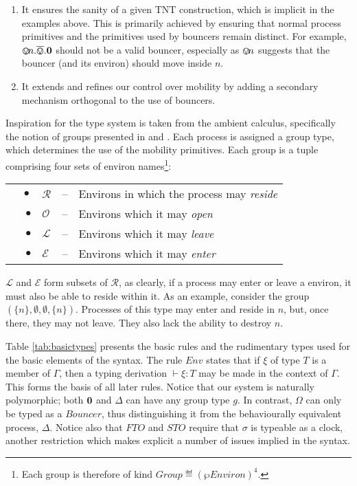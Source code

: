\documentclass[orivec,envcountsame]{llncs}
\begin{document}
\begin{enumerate}
\item It ensures the sanity of a given TNT construction, which is
  implicit in the examples above.  This is primarily achieved by
  ensuring that normal process primitives and the primitives used by
  bouncers remain distinct.  For example,
  $\varovee\!n.\overline{\varovee}.\textbf{0}$ should not be a valid bouncer,
  especially as $\varovee\!n$ suggests that the bouncer (and its environ)
  should move inside $n$.
\item It extends and refines our control over mobility by adding a
      secondary mechanism orthogonal to the use of bouncers.
\end{enumerate}

Inspiration for the type system is taken from the ambient calculus,
specifically the notion of groups presented in \cite{ambienttypes} and
\cite{m3}.  Each process is assigned a group type, which determines the
use of the mobility primitives.  Each group is a tuple comprising four
sets of environ names\footnote{Each group is therefore of kind $Group
\eqdef (\wp\mathit{Environ})^4$.}:

\begin{tabular}{rlcl}
$\quad \bullet$ & $\mathscr{R}$ & -- & Environs in which the process may
 \emph{reside} \\
$\bullet$ & $\mathscr{O}$ & -- & Environs which it may \emph{open} \\
$\bullet$ & $\mathscr{L}$ & -- & Environs which it may \emph{leave} \\
$\bullet$ & $\mathscr{E}$ & -- & Environs which it may \emph{enter}
\end{tabular}

$\mathscr{L}$ and $\mathscr{E}$ form subsets of $\mathscr{R}$, as
clearly, if a process may enter or leave a environ, it must also be able
to reside within it.  As an example, consider the group
$(\{n\},\emptyset, \emptyset,\{n\})$.  Processes of this type may enter
and reside in $n$, but, once there, they may not leave.  They also lack
the ability to destroy $n$.

Table \ref{tab:basictypes} presents the basic rules and the rudimentary
types used for the basic elements of the syntax. The rule $Env$ states
that if $\xi$ of type $T$ is a member of $\Gamma$, then a typing
derivation $\vdash \xi : T$ may be made in the context of $\Gamma$.
This forms the basis of all later rules.  Notice that our system is
naturally polymorphic; both $\textbf{0}$ and $\Delta$ can have any group type
$g$.  In contrast, $\Omega$ can only be typed as a $Bouncer$, thus
distinguishing it from the behaviourally equivalent process, $\Delta$.
Notice also that $FTO$ and $STO$ require that $\sigma$ is typeable as a
clock, another restriction which makes explicit a number of issues
implied in the syntax.
\end{document}
